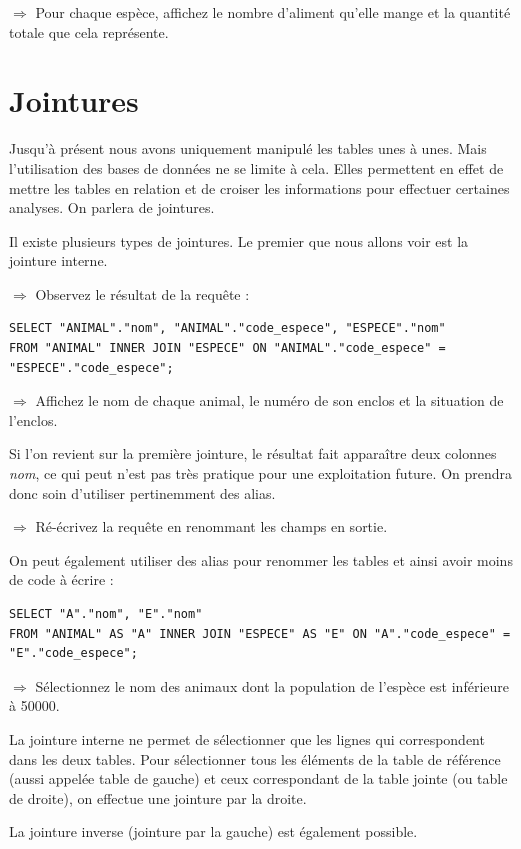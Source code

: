 \documentclass[11pt]{article}
\newcommand{\action}{$\Rightarrow$ }
\begin{document}
\action Pour chaque espèce, affichez le nombre d'aliment qu'elle mange et la quantité totale que cela représente.



\section{Jointures}
Jusqu'à présent nous avons uniquement manipulé les tables unes à unes. Mais l'utilisation des bases de données ne se limite à cela. Elles permettent en effet de mettre les tables en relation et de croiser les informations pour effectuer certaines analyses. On parlera de jointures.

Il existe plusieurs types de jointures. Le premier que nous allons voir est la jointure interne.

\action Observez le résultat de la requête :
\begin{lstlisting}
SELECT "ANIMAL"."nom", "ANIMAL"."code_espece", "ESPECE"."nom" 
FROM "ANIMAL" INNER JOIN "ESPECE" ON "ANIMAL"."code_espece" = "ESPECE"."code_espece";
\end{lstlisting}

\action Affichez le nom de chaque animal, le numéro de son enclos et la situation de l'enclos.

Si l'on revient sur la première jointure, le résultat fait apparaître deux colonnes \textit{nom}, ce qui peut n'est pas très pratique pour une exploitation future. On prendra donc soin d'utiliser pertinemment des alias.

\action Ré-écrivez la requête en renommant les champs en sortie.

On peut également utiliser des alias pour renommer les tables et ainsi avoir moins de code à écrire :
\begin{lstlisting}
SELECT "A"."nom", "E"."nom" 
FROM "ANIMAL" AS "A" INNER JOIN "ESPECE" AS "E" ON "A"."code_espece" = "E"."code_espece";
\end{lstlisting}

\action Sélectionnez le nom des animaux dont la population de l'espèce est inférieure à 50000.

La jointure interne ne permet de sélectionner que les lignes qui correspondent dans les deux tables. Pour sélectionner tous les éléments de la table de référence (aussi appelée table de gauche) et ceux correspondant de la table jointe (ou table de droite), on effectue une jointure par la droite.

La jointure inverse (jointure par la gauche) est également possible.
\end{document}
